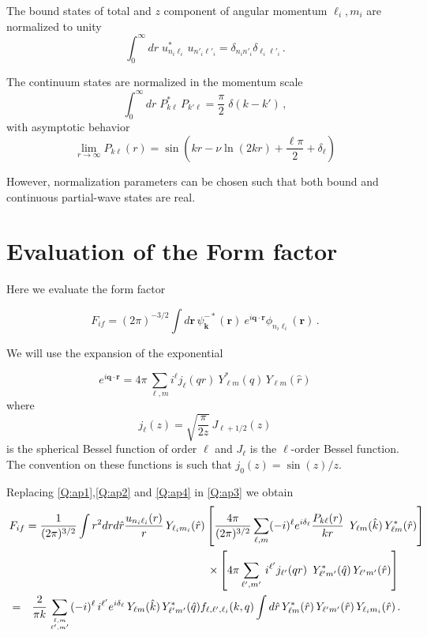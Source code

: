 The bound states of total and $z$ component of angular momentum
$\ell_{i}, m_{i}$ are normalized to unity
\[
\int_{0}^{\infty} d r \; u^{*}_{n_{i} \ell_{i}} \, u_{n'_{i}
\ell'_{i}} = \delta_{n_{i} n'_{i}} \delta_{\ell_{i} \ell'_{i}} \, .
\]

The continuum states are normalized in the momentum scale
\[
\int_{0}^{\infty} d r \; P^{*}_{k \ell} \, P_{k' \ell} =
\frac{\pi}{2}\; \delta(k-k') \, ,
\]
with asymptotic behavior
\[
\lim_{r \to \infty} P_{k \ell}(r) = \sin\left( kr - \nu \ln(2 k r) +
\frac{\ell \pi}{2} + \delta_{\ell} \right)
\]

However, normalization parameters can be chosen such that both bound
and continuous partial-wave states are real.

\section{Evaluation of the Form factor}

Here we evaluate the form factor

\begin{equation}\label{Q:ap3}
F_{if} = (2 \pi)^{-3/2} \int d \bm{r} \, \psi^{-*}_{\bm{k}}(\bm{r})
\ e^{i \bm{q} \cdot \bm{r}} \phi_{n_{i} \ell_{i}}(\bm{r}) \,.
\end{equation}

We will use the expansion of the exponential \cite[(A.42)]{Galindo1990_QMvI}

\begin{equation}\label{Q:ap4}
e^{i \bm{q} \cdot \bm{r}} = 4 \pi \, \sum_{\ell, m} i^{\ell}
j_{\ell}(q r) \ Y^{*}_{\ell m}(\hat{q})\, Y_{\ell m}(\hat{r})
\end{equation}
where
\[
j_{\ell}(z) = \sqrt{\frac{\pi}{2z}}\, J_{\ell +1/2}(z)
\]
is the spherical Bessel function of order $\ell$
\cite[(A.116)]{Galindo1990_QMvI} and $J_{\ell}$ is the $\ell$-order Bessel
function. The convention on these functions is such that
$j_{0}(z)=\sin(z)/z$.

Replacing \ref{Q:ap1},\ref{Q:ap2} and \ref{Q:ap4} in \ref{Q:ap3} we
obtain
\begin{eqnarray*}
\lefteqn{F_{if} = \frac{1}{(2 \pi)^{3/2}} \int r^{2} d r d
\hat{r} \frac{u_{n_{i}\ell_{i}}(r)}{r}\, Y_{\ell_{i} m_{i}}(\hat{r})
\left[ \frac{4 \pi}{(2 \pi)^{3/2}} \sum_{\ell,m} (-i)^{\ell}
e^{i \delta_{\ell}} \frac{P_{k \ell}(r)}{k r} \,\ Y_{\ell
m}(\hat{k})\, Y^{*}_{\ell m}(\hat{r}) \right]}
\\
&& \qquad \qquad {\times} \left[ 4 \pi  \sum_{\ell',m'} \, i^{\ell'}
j_{\ell'}(q r) \, \ Y^{*}_{\ell' m'}(\hat{q})\, Y_{\ell' m'}(\hat{r})
\right]\,
\\
&=& \frac{2}{\pi k} \sum_{{\ell,m \atop \ell',m'}}  (-i)^{\ell} \,
i^{\ell'} e^{i \delta_{\ell}} \,Y_{\ell m}(\hat{k})\,
Y^{*}_{\ell' m'}(\hat{q}) f_{\ell,\ell',\ell_{i}}(k,q) \int d
\hat{r}\, Y^{*}_{\ell m}(\hat{r}) \, Y_{\ell' m'}(\hat{r}) \,
Y_{\ell_{i} m_{i}}(\hat{r}) \, .
\end{eqnarray*}

